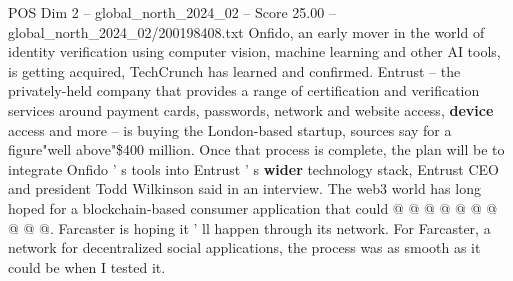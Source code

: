 \begin{textsample}{POS Dim 2 – global\_north\_2024\_02 – Score 25.00 – global\_north\_2024\_02/200198408.txt}
Onfido, an early mover in the world of identity verification using computer vision, machine learning and other AI tools, is getting acquired, TechCrunch has learned and confirmed.
Entrust -- the privately-held company that provides a range of certification and verification services around payment cards, passwords, network and website access, \textbf{device} access and more -- is buying the London-based startup, sources say for a figure"well above"\$400 million.
Once that process is complete, the plan will be to integrate Onfido ' s tools into Entrust ' s \textbf{wider} technology stack, Entrust CEO and president Todd Wilkinson said in an interview.
The web3 world has long hoped for a blockchain-based consumer application that could @ @ @ @ @ @ @ @ @ @.
Farcaster is hoping it ' ll happen through its network.
For Farcaster, a network for decentralized social applications, the process was as smooth as it could be when I tested it.

\end{textsample}
